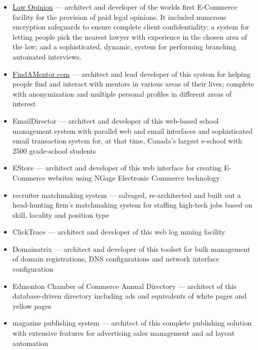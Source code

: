\documentclass[line,margin,hidelinks]{res}
\begin{document}
\begin{resume}
\begin{position}
\begin{itemize}
\item \href{https://web.archive.org/web/19991205174419/http://www.lawopinion.com/}{Law Opinion}
   --- architect and developer of the worlds first E-Commerce facility for
       the provision of paid legal opinions.
       It included numerous encryption safeguards
       to ensure complete client confidentiality; a
       system for letting people pick the nearest
       lawyer with experience in the chosen area of
       the law;  and a sophisticated, dynamic,
       system for performing branching automated interviews.
\item \href{http://findamentor.com/}{FindAMentor.com}
   --- architect and lead developer of this system
       for helping people find and interact with mentors in
       various areas of their lives; complete with anonymization and
        multiple personal profiles in different areas of interest
\item EmailDirector
   --- architect and developer of this web-based school management
       system with parallel web and email interfaces
       and sophisticated email transaction system for,
       at that time, Canada's largest e-school
       with 2500 grade-school students
\item EStore
   --- architect and developer of this web interface for creating E-Commerce
       websites using NGage Electronic Commerce technology
\item recruiter matchmaking system
   --- salvaged, re-architected and built out a head-hunting firm's
       matchmaking system for staffing high-tech jobs based on skill, locality
       and position type
\item ClickTrace --- architect and developer of this web log mining facility
\item Domainatrix --- architect and developer of this
                      toolset for bulk management of domain registrations,
                      DNS configurations and network interface
                      configuration
\item Edmonton Chamber of Commerce Annual Directory ---
         architect of this database-driven directory
         including ads and equivalents of white pages and yellow pages
\item magazine publishing system ---
  architect of this complete publishing solution
  with extensive features for advertising sales management and ad layout
  automation

\end{itemize}


\end{position}
\end{resume}
\end{document}
